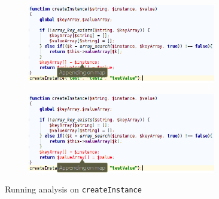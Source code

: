 \begin{figure}
\centering

\begin{subfigure}{\textwidth}
\centering
\includegraphics[width=0.9\textwidth]{chapters/caseStudy/newScreens/instance1}
\label{fig:typeHandlerScreenshot-1}
\end{subfigure}

\begin{subfigure}{\textwidth}
\centering
\includegraphics[width=0.9\textwidth]{chapters/caseStudy/newScreens/instance2}
\label{fig:typeHandlerScreenshot-2}
\end{subfigure}

\caption{Running analysis on \texttt{createInstance}}
\label{fig:typeHandlerScreenshot}
\end{figure}

